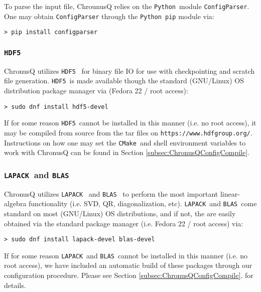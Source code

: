 \documentclass[12pt]{article}
\newcommand{\CMake}{\texttt{CMake}}
\newcommand{\HDF}{\texttt{HDF5}}
\newcommand{\LAPACK}{\texttt{LAPACK}}
\newcommand{\BLAS}{\texttt{BLAS}}
\newcommand{\Python}{\texttt{Python}}
\begin{document}
        \noindent To parse the input file, ChrounusQ relies on the \Python~module 
	\texttt{ConfigParser}. One may obtain \texttt{ConfigParser} through
	the \Python~\texttt{pip} module via:
	 
	\begin{lstlisting}
> pip install configparser
	\end{lstlisting}

      \subsubsection{\HDF} \label{subsubsec:HDF5} 
        ChronusQ utilizes \HDF~\cite{hdf5} for binary file IO for use with 
        checkpointing and scratch file generation. \HDF~is made available
	though the standard (GNU/Linux) OS distribution package manager via
	(Fedora 22 / root access):

	\begin{lstlisting}
> sudo dnf install hdf5-devel
	\end{lstlisting}

	\noindent If for some reason \HDF~cannot be installed in this manner (i.e. 
	no root access), it may be compiled from source from the tar files on
	\texttt{https://www.hdfgroup.org/}. Instructions on how one may set
	the \CMake~and shell environment variables to work with ChronusQ
	can be found in Section \ref{subsec:ChronusQConfigCompile}.

      \subsubsection{\LAPACK~and \BLAS} \label{subsubsec:LA} 
        ChronusQ utilizes \LAPACK~\cite{lapack} and \BLAS~\cite{blas1,blas2,blas3,atlas} to perform
        the most important linear-algebra functionality (i.e. SVD, QR, 
	diagonalization, etc). \LAPACK~and \BLAS~come standard on most
	(GNU/Linux) OS distributions, and if not, the are easily obtained via
	the standard package manager (i.e. Fedora 22 / root access) via:

	\begin{lstlisting}
> sudo dnf install lapack-devel blas-devel
	\end{lstlisting}

	\noindent If for some reason \LAPACK~and \BLAS~cannot be installed in this 
	manner (i.e. no root access), we have included an automatic build of these 
	packages through our configuration procedure. Please see Section 
	\ref{subsec:ChronusQConfigCompile}. for details.
\end{document}
